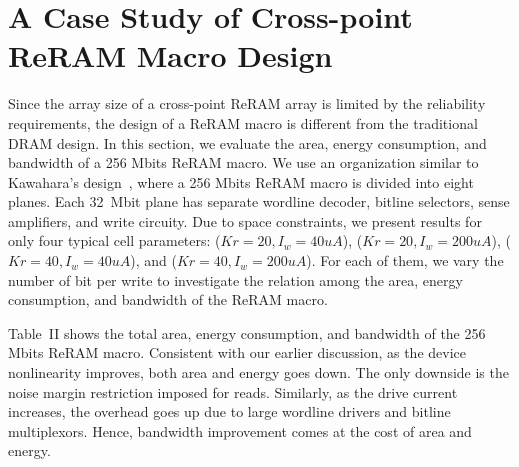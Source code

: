 \vspace{-5pt}
\section{A Case Study of Cross-point ReRAM Macro Design}\label{sec:macro}
Since the array size of a cross-point ReRAM array is limited by
the reliability requirements, the design of a ReRAM macro is different
from the traditional DRAM design. 
In this section, we evaluate the area, energy consumption, and bandwidth of a
256 Mbits ReRAM macro.
We use an organization similar to Kawahara's design~\cite{crossbar_Panasonic}, where
a 256 Mbits ReRAM macro is divided into 
eight planes. Each 32~Mbit plane has separate wordline
decoder, bitline selectors, sense amplifiers, and write circuity. Due to
space constraints, we present results for only
four typical cell parameters: ($Kr=20,
I_w=40uA$), ($Kr=20, I_w=200uA$), ($Kr=40, I_w=40uA$), and ($Kr=40,
I_w=200uA$). For each of them, we vary the number of bit per write to
investigate the relation among the area, energy consumption, and bandwidth
of the ReRAM macro.


Table~II shows the total area, energy consumption, and bandwidth of the
256 Mbits ReRAM macro. Consistent with our earlier discussion, 
as the device nonlinearity improves, both area and energy 
goes down. The only downside is the noise margin restriction
imposed for reads. Similarly, as the drive current increases, the overhead
goes up due to large wordline drivers and bitline multiplexors. 
Hence, bandwidth improvement comes at the cost of area
and energy. 

